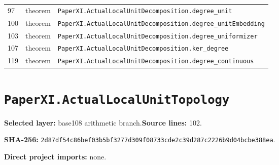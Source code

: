 \documentclass[10pt,oneside]{book}
\begin{document}
\begin{longtable}{@{}p{}p{}p{}@{}}
97&theorem&\nolinkurl{PaperXI.ActualLocalUnitDecomposition.degree_unit}\\

100&theorem&\nolinkurl{PaperXI.ActualLocalUnitDecomposition.degree_unitEmbedding}\\

103&theorem&\nolinkurl{PaperXI.ActualLocalUnitDecomposition.degree_uniformizer}\\

107&theorem&\nolinkurl{PaperXI.ActualLocalUnitDecomposition.ker_degree}\\

119&theorem&\nolinkurl{PaperXI.ActualLocalUnitDecomposition.degree_continuous}\\

\bottomrule\end{longtable}

\section{\texorpdfstring{\nolinkurl{PaperXI.ActualLocalUnitTopology}}{PaperXI.ActualLocalUnitTopology}}\label{module:PaperXI.ActualLocalUnitTopology}

\textbf{Selected layer:} base108 arithmetic branch.\quad\textbf{Source lines:} 102.\par\textbf{SHA-256:} {\scriptsize\nolinkurl{2d87df54c86bef03b5bf3277d309f08733cde2c39d287c2226b9d04bcbe388ea}}.


\textbf{Direct project imports:} none.
\end{document}
